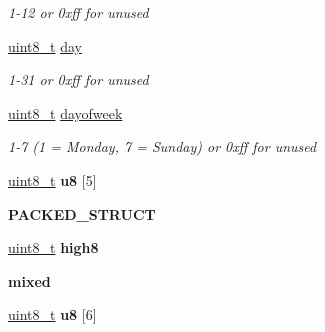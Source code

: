 \begin{DoxyCompactItemize}
\begin{DoxyCompactList}\small\item\em 1-\/12 or 0xff for unused \end{DoxyCompactList}\item 
\mbox{\label{group__zcl__types_ga72369a1087b2aeffe374bb054cb97c12}} 
\hyperlink{group__hal__dos_gae1affc9ca37cfb624959c866a73f83c2}{uint8\+\_\+t} \hyperlink{group__zcl__types_ga72369a1087b2aeffe374bb054cb97c12}{day}
\begin{DoxyCompactList}\small\item\em 1-\/31 or 0xff for unused \end{DoxyCompactList}\item 
\mbox{\label{group__zcl__types_gaf19fd1d4c2d4e9354c68c3b5546b7d41}} 
\hyperlink{group__hal__dos_gae1affc9ca37cfb624959c866a73f83c2}{uint8\+\_\+t} \hyperlink{group__zcl__types_gaf19fd1d4c2d4e9354c68c3b5546b7d41}{dayofweek}
\begin{DoxyCompactList}\small\item\em 1-\/7 (1 = Monday, 7 = Sunday) or 0xff for unused \end{DoxyCompactList}\item 
\mbox{\label{group__zcl__types_gad4679e287f6f18ba62228daa926eea7b}} 
\hyperlink{group__hal__dos_gae1affc9ca37cfb624959c866a73f83c2}{uint8\+\_\+t} {\bfseries u8} \mbox{[}5\mbox{]}
\item 
{\bfseries P\+A\+C\+K\+E\+D\+\_\+\+S\+T\+R\+U\+CT}
\item 
\mbox{\label{group__zcl__types_gac0be63c87188a7765bd25f38f3bf5b9e}} 
\hyperlink{group__hal__dos_gae1affc9ca37cfb624959c866a73f83c2}{uint8\+\_\+t} {\bfseries high8}
\item 
\mbox{\label{group__zcl__types_ga1c5d0403e0a7a57d3778e56e8798faa8}} 
{\bfseries mixed}
\item 
\mbox{\label{group__zcl__types_ga0989b828fcba5b50454c134bb08c46ac}} 
\hyperlink{group__hal__dos_gae1affc9ca37cfb624959c866a73f83c2}{uint8\+\_\+t} {\bfseries u8} \mbox{[}6\mbox{]}
\item 
\mbox{\label{group__zcl__types_ga41b61059ce2e09f103fbd64c9abe5bff}} 

\end{DoxyCompactItemize}
